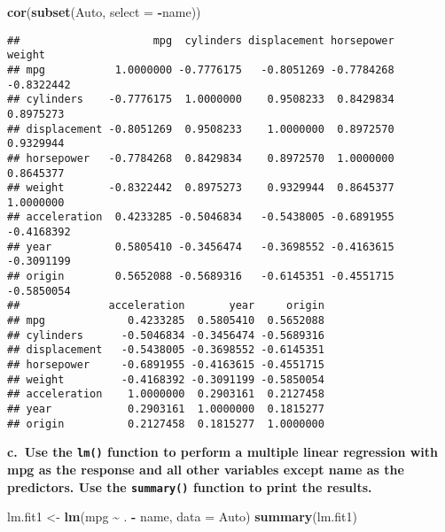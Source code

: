 \documentclass[
]{article}
\newenvironment{Shaded}{\begin{snugshade}}{\end{snugshade}}
\newcommand{\AttributeTok}[1]{\textcolor[rgb]{0.13,0.29,0.53}{#1}}
\newcommand{\FunctionTok}[1]{\textcolor[rgb]{0.13,0.29,0.53}{\textbf{#1}}}
\newcommand{\NormalTok}[1]{#1}
\newcommand{\OtherTok}[1]{\textcolor[rgb]{0.56,0.35,0.01}{#1}}
\newcommand{\SpecialCharTok}[1]{\textcolor[rgb]{0.81,0.36,0.00}{\textbf{#1}}}
\begin{document}
\begin{Shaded}
\begin{Highlighting}[]
\FunctionTok{cor}\NormalTok{(}\FunctionTok{subset}\NormalTok{(Auto, }\AttributeTok{select =} \SpecialCharTok{{-}}\NormalTok{name))}
\end{Highlighting}
\end{Shaded}

\begin{verbatim}
##                     mpg  cylinders displacement horsepower     weight
## mpg           1.0000000 -0.7776175   -0.8051269 -0.7784268 -0.8322442
## cylinders    -0.7776175  1.0000000    0.9508233  0.8429834  0.8975273
## displacement -0.8051269  0.9508233    1.0000000  0.8972570  0.9329944
## horsepower   -0.7784268  0.8429834    0.8972570  1.0000000  0.8645377
## weight       -0.8322442  0.8975273    0.9329944  0.8645377  1.0000000
## acceleration  0.4233285 -0.5046834   -0.5438005 -0.6891955 -0.4168392
## year          0.5805410 -0.3456474   -0.3698552 -0.4163615 -0.3091199
## origin        0.5652088 -0.5689316   -0.6145351 -0.4551715 -0.5850054
##              acceleration       year     origin
## mpg             0.4233285  0.5805410  0.5652088
## cylinders      -0.5046834 -0.3456474 -0.5689316
## displacement   -0.5438005 -0.3698552 -0.6145351
## horsepower     -0.6891955 -0.4163615 -0.4551715
## weight         -0.4168392 -0.3091199 -0.5850054
## acceleration    1.0000000  0.2903161  0.2127458
## year            0.2903161  1.0000000  0.1815277
## origin          0.2127458  0.1815277  1.0000000
\end{verbatim}

\textbf{c.~Use the \texttt{lm()} function to perform a multiple linear
regression with mpg as the response and all other variables except name
as the predictors. Use the \texttt{summary()} function to print the
results.}

\begin{Shaded}
\begin{Highlighting}[]
\NormalTok{lm.fit1 }\OtherTok{\textless{}{-}}  \FunctionTok{lm}\NormalTok{(mpg }\SpecialCharTok{\textasciitilde{}}\NormalTok{ . }\SpecialCharTok{{-}}\NormalTok{ name, }\AttributeTok{data =}\NormalTok{ Auto)}
\FunctionTok{summary}\NormalTok{(lm.fit1)}
\end{Highlighting}
\end{Shaded}
\end{document}
